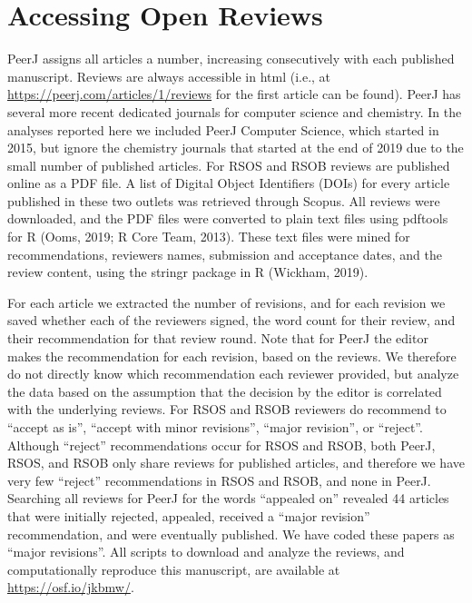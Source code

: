 \documentclass[,jou, a4paper,floatsintext]{apa6}
\begin{document}
\hypertarget{accessing-open-reviews}{%
\section{Accessing Open Reviews}\label{accessing-open-reviews}}

PeerJ assigns all articles a number, increasing consecutively with each published manuscript. Reviews are always accessible in html (i.e., at \url{https://peerj.com/articles/1/reviews} for the first article can be found). PeerJ has several more recent dedicated journals for computer science and chemistry. In the analyses reported here we included PeerJ Computer Science, which started in 2015, but ignore the chemistry journals that started at the end of 2019 due to the small number of published articles. For RSOS and RSOB reviews are published online as a PDF file. A list of Digital Object Identifiers (DOIs) for every article published in these two outlets was retrieved through Scopus. All reviews were downloaded, and the PDF files were converted to plain text files using pdftools for R (Ooms, 2019; R Core Team, 2013). These text files were mined for recommendations, reviewers names, submission and acceptance dates, and the review content, using the stringr package in R (Wickham, 2019).

For each article we extracted the number of revisions, and for each revision we saved whether each of the reviewers signed, the word count for their review, and their recommendation for that review round. Note that for PeerJ the editor makes the recommendation for each revision, based on the reviews. We therefore do not directly know which recommendation each reviewer provided, but analyze the data based on the assumption that the decision by the editor is correlated with the underlying reviews. For RSOS and RSOB reviewers do recommend to \enquote{accept as is}, \enquote{accept with minor revisions}, \enquote{major revision}, or \enquote{reject}. Although \enquote{reject} recommendations occur for RSOS and RSOB, both PeerJ, RSOS, and RSOB only share reviews for published articles, and therefore we have very few \enquote{reject} recommendations in RSOS and RSOB, and none in PeerJ. Searching all reviews for PeerJ for the words \enquote{appealed on} revealed 44 articles that were initially rejected, appealed, received a \enquote{major revision} recommendation, and were eventually published. We have coded these papers as \enquote{major revisions}. All scripts to download and analyze the reviews, and computationally reproduce this manuscript, are available at \url{https://osf.io/jkbmw/}.
\end{document}
